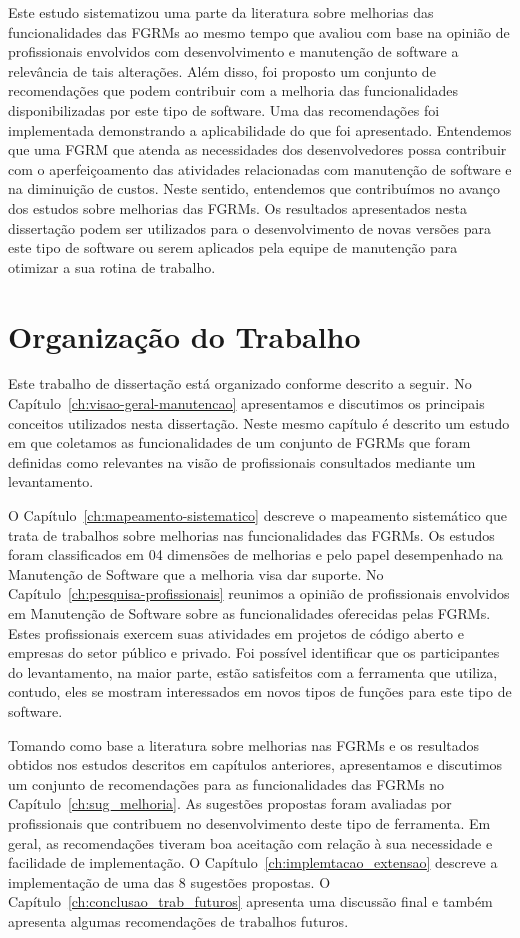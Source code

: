 Este estudo sistematizou uma parte da literatura sobre melhorias das
funcionalidades das FGRMs ao mesmo tempo que avaliou com base na opinião de
profissionais envolvidos com desenvolvimento e manutenção de software a
relevância de tais alterações. Além disso, foi proposto um conjunto de
recomendações que podem contribuir com a melhoria das funcionalidades
disponibilizadas por este tipo de software. Uma das recomendações foi
implementada demonstrando a aplicabilidade do que foi apresentado. Entendemos
que uma FGRM que atenda as necessidades dos desenvolvedores possa contribuir
com o aperfeiçoamento das atividades relacionadas com manutenção de software e
na diminuição de custos. Neste sentido, entendemos que contribuímos no avanço
dos estudos sobre melhorias das FGRMs. Os resultados apresentados nesta
dissertação podem ser utilizados para o desenvolvimento de novas versões para
este tipo de software ou serem aplicados pela equipe de manutenção para
otimizar a sua rotina de trabalho.

\section{Organização do Trabalho}
\label{sec:intro-organizacao-dissertacao}

Este trabalho de dissertação está organizado conforme descrito a seguir. No
Capítulo~\ref{ch:visao-geral-manutencao} apresentamos e discutimos os principais
conceitos utilizados nesta dissertação. Neste mesmo capítulo é descrito um
estudo em que coletamos as funcionalidades de um conjunto de FGRMs que foram
definidas como relevantes na visão de profissionais consultados mediante um
levantamento.

O Capítulo~\ref{ch:mapeamento-sistematico} descreve o mapeamento sistemático que
trata de trabalhos sobre melhorias nas funcionalidades das FGRMs. Os estudos
foram classificados em 04 dimensões de melhorias e pelo papel desempenhado na
Manutenção de Software que a melhoria visa dar suporte. No
Capítulo~\ref{ch:pesquisa-profissionais} reunimos a opinião de profissionais
envolvidos em Manutenção de Software sobre as funcionalidades oferecidas pelas
FGRMs. Estes profissionais exercem suas atividades em projetos de código aberto
e empresas do setor público e privado. Foi possível identificar que os
participantes do levantamento, na maior parte, estão satisfeitos com a
ferramenta que utiliza, contudo, eles se mostram interessados em novos tipos de
funções para este tipo de software.

Tomando como base a literatura sobre melhorias nas FGRMs e os resultados obtidos
nos estudos descritos em capítulos anteriores, apresentamos e discutimos um
conjunto de recomendações para as funcionalidades das FGRMs no
Capítulo~\ref{ch:sug_melhoria}. As sugestões propostas foram avaliadas por
profissionais que contribuem no desenvolvimento deste tipo de ferramenta. Em
geral, as recomendações tiveram boa aceitação com relação à sua necessidade e
facilidade de implementação. O Capítulo~\ref{ch:implemtacao_extensao} descreve a
implementação de uma das 8 sugestões propostas. O
Capítulo~\ref{ch:conclusao_trab_futuros} apresenta uma discussão final e também
apresenta algumas recomendações de trabalhos futuros.
